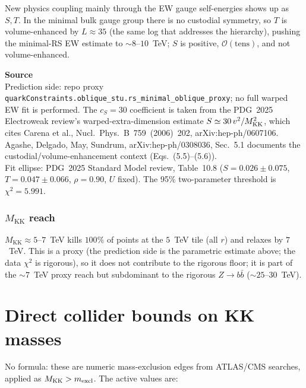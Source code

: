 \documentclass[11pt]{article}
\newcommand{\MKK}{M_{\mathrm{KK}}}
\newenvironment{srcbox}{\begin{srcboxframe}\small\raggedright\sloppy}{\end{srcboxframe}}
\begin{document}
\smallskip
\noindent New physics coupling mainly through the EW gauge self-energies shows up
as $S,T$. In the minimal bulk gauge group there is no custodial symmetry, so $T$ is
volume-enhanced by $L\approx35$ (the same log that addresses the hierarchy),
pushing the minimal-RS EW estimate to $\sim8$--$10$~TeV; $S$ is positive,
$\mathcal{O}(\text{tens})$, and not volume-enhanced.

\begin{srcbox}
\textbf{Source}\\[2pt]
Prediction side: repo proxy \texttt{quarkConstraints.oblique\_stu.rs\_minimal\_oblique\_proxy}; no full
warped EW fit is performed. The $c_S=30$ coefficient is taken from the PDG~2025
Electroweak review's warped-extra-dimension estimate
$S\simeq30\,v^2/M_{\rm KK}^2$, which cites Carena et al.,
Nucl.~Phys.~B~759~(2006)~202, arXiv:hep-ph/0607106. Agashe, Delgado, May,
Sundrum, arXiv:hep-ph/0308036, Sec.~5.1 documents the
custodial/volume-enhancement context (Eqs.~(5.5)--(5.6)).\\[2pt]
Fit ellipse: PDG~2025 Standard Model review, Table~10.8
($S=0.026\pm0.075$, $T=0.047\pm0.066$, $\rho=0.90$, $U$ fixed). The
95\% two-parameter threshold is $\chi^2=5.991$.
\end{srcbox}

\subsubsection*{$\MKK$ reach}
$\MKK\approx5$--$7$~TeV kills $100\%$ of
points at the $5$~TeV tile (all $r$) and relaxes by $7$~TeV. This is a proxy (the
prediction side is the parametric estimate above; the data $\chi^2$ is rigorous),
so it does not contribute to the rigorous floor; it is part of the $\sim7$~TeV proxy
reach but subdominant to the rigorous $Z\to b\bar b$ ($\sim25$--$30$~TeV).
\bigskip
\section*{Direct collider bounds on KK masses}

\noindent No formula: these are numeric mass-exclusion edges from
ATLAS/CMS searches, applied as $\MKK > m_{\rm excl}$. The active values are:
\end{document}
